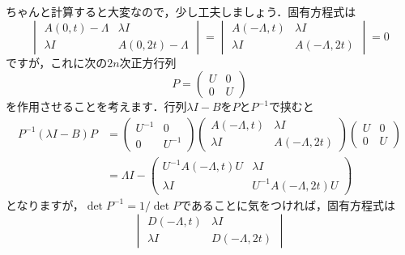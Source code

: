 \documentclass[a4paper,pdflatex,ja=standard]{bxjsarticle}
\begin{document}
\begin{enumerate}
\begin{enumerate}
    ちゃんと計算すると大変なので，少し工夫しましょう．固有方程式は
    \begin{equation}
      \begin{vmatrix}
        A(0,t)-\Lambda & \lambda I \\
        \lambda I & A(0,2t)-\Lambda
      \end{vmatrix}
      =
      \begin{vmatrix}
        A(-\Lambda,t) & \lambda I \\
        \lambda I & A(-\Lambda,2t)
      \end{vmatrix}
      =
      0
    \end{equation}
    ですが，これに次の$2n$次正方行列
    \begin{equation}
      P
      =
      \begin{pmatrix}
        U & 0 \\
        0 & U
      \end{pmatrix}
    \end{equation}
    を作用させることを考えます．行列$\lambda I-B$を$P$と$P^{-1}$で挟むと
    \begin{align}
      P^{-1}(\lambda I-B)P
      &=
      \begin{pmatrix}
        U^{-1} & 0 \\
        0 & U^{-1}
      \end{pmatrix}
      \begin{pmatrix}
        A(-\Lambda,t) & \lambda I \\
        \lambda I & A(-\Lambda,2t)
      \end{pmatrix}
      \begin{pmatrix}
        U & 0 \\
        0 & U
      \end{pmatrix}
      \nonumber
      \\
      &=
      \Lambda I
      -
      \begin{pmatrix}
        U^{-1}A(-\Lambda,t)U & \lambda I \\
        \lambda I & U^{-1}A(-\Lambda,2t)U
      \end{pmatrix}
    \end{align}
    となりますが，$\det P^{-1}=1/\det P$であることに気をつければ，固有方程式は
    \begin{equation}
      \begin{vmatrix}
        D(-\Lambda,t) & \lambda I \\
        \lambda I & D(-\Lambda,2t)
      \end{vmatrix}

\end{equation}
\end{enumerate}
\end{enumerate}
\end{document}
